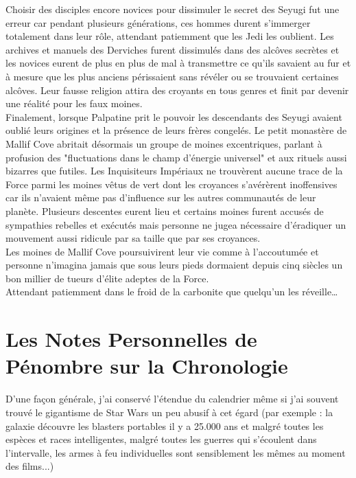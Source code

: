 \documentclass[twoside]{article}
\begin{document}
Choisir des disciples encore novices pour dissimuler le secret des Seyugi fut une erreur car pendant plusieurs générations, ces hommes durent s'immerger totalement dans leur rôle, attendant patiemment que les Jedi les oublient. Les archives et manuels des Derviches furent dissimulés dans des alcôves secrètes et les novices eurent de plus en plus de mal à transmettre ce qu'ils savaient au fur et à mesure que les plus anciens périssaient sans révéler ou se trouvaient certaines alcôves. Leur fausse religion attira des croyants en tous genres et finit par devenir une réalité pour les faux moines.\\

Finalement, lorsque Palpatine prit le pouvoir les descendants des Seyugi avaient oublié leurs origines et la présence de leurs frères congelés. Le petit monastère de Mallif Cove abritait désormais un groupe de moines excentriques, parlant à profusion des "fluctuations dans le champ d'énergie universel" et aux rituels aussi bizarres que futiles. Les Inquisiteurs Impériaux ne trouvèrent aucune trace de la Force parmi les moines vêtus de vert dont les croyances s'avérèrent inoffensives car ils n'avaient même pas d'influence sur les autres communautés de leur planète. Plusieurs descentes eurent lieu et certains moines furent accusés de sympathies rebelles et exécutés mais personne ne jugea nécessaire d'éradiquer un mouvement aussi ridicule par sa taille que par ses croyances.\\

Les moines de Mallif Cove poursuivirent leur vie comme à l'accoutumée et personne n'imagina jamais que sous leurs pieds dormaient depuis cinq siècles un bon millier de tueurs d'élite adeptes de la Force.\\

Attendant patiemment dans le froid de la carbonite que quelqu'un les réveille\ldots

\clearpage

\appendix

\section{Les Notes Personnelles de Pénombre sur la Chronologie}

D'une façon générale, j'ai conservé l'étendue du calendrier même si j'ai souvent trouvé le gigantisme de Star Wars un peu abusif à cet égard (par exemple : la galaxie découvre les blasters portables il y a 25.000 ans et malgré toutes les espèces et races intelligentes, malgré toutes les guerres qui s'écoulent dans l'intervalle,  les armes à feu individuelles sont sensiblement les mêmes au moment des films...)
\end{document}
